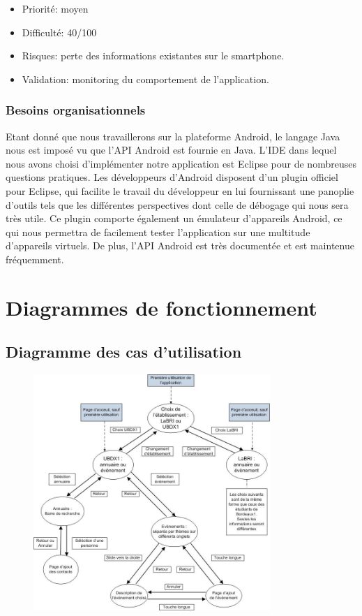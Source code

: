 \documentclass [pdftex,12pt] {report}
\begin{document}
\begin{itemize}
\renewcommand{\labelitemi}{$\bullet$}
\item Priorité: moyen
\item Difficulté: 40/100
\item Risques: perte des informations existantes sur le smartphone.
\item Validation: monitoring du comportement de l'application.
\end{itemize} 


\subsection{Besoins organisationnels}
Etant donné que nous travaillerons sur la plateforme Android, le langage Java nous est imposé vu que l'API Android est fournie en Java.
L'IDE dans lequel nous avons choisi d'implémenter notre application est Eclipse pour de nombreuses questions pratiques. Les développeurs d'Android disposent d'un plugin officiel pour Eclipse, qui facilite le travail du développeur en lui fournissant une panoplie d'outils tels que les différentes perspectives dont celle de débogage qui nous sera très utile. Ce plugin comporte également un émulateur d'appareils Android, ce qui nous permettra de facilement tester l'application sur une multitude d'appareils virtuels. De plus, l'API Android est très documentée et est maintenue fréquemment.



\chapter{Diagrammes de fonctionnement}

\section{Diagramme des cas d'utilisation}

\begin{figure}[h]
  \center
  \includegraphics[width=0.8\textwidth]{resources/useCases.jpg}
\end{figure}
\end{document}

